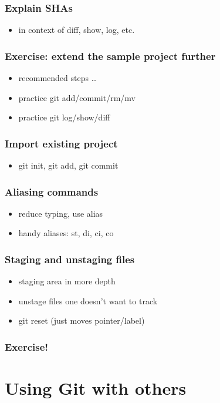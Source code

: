 \documentclass{git_course}
\begin{document}
\begin{frame}
\frametitle{Explain SHAs}
\begin{itemize}
    \item in context of diff, show, log, etc.
\end{itemize}
\end{frame}

\begin{frame}
\frametitle{Exercise: extend the sample project further}
\begin{itemize}
    \item recommended steps \ldots
    \item practice git add/commit/rm/mv
    \item practice git log/show/diff
\end{itemize}
\end{frame}

\begin{frame}
\frametitle{Import existing project}
\begin{itemize}
    \item git init, git add, git commit
\end{itemize}
\end{frame}

\begin{frame}
\frametitle{Aliasing commands}
\begin{itemize}
    \item reduce typing, use alias
    \item handy aliases: st, di, ci, co
\end{itemize}
\end{frame}

\begin{frame}
\frametitle{Staging and unstaging files}
\begin{itemize}
    \item staging area in more depth
    \item unstage files one doesn't want to track
    \item git reset (just moves pointer/label)
\end{itemize}
\end{frame}

\begin{frame}
\frametitle{Exercise!}
\end{frame}

\section{Using Git with others}
\end{document}
